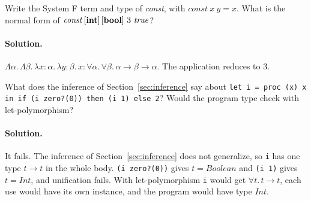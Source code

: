 \begin{exercise}
Write the System F term and type of \textit{const}, with
$\mathit{const}\ x\ y = x$. What is the normal form of
$\mathit{const}\,[\tyint]\,[\tybool]\ 3\ \mathit{true}$?
\end{exercise}

\paragraph{Solution.} $\Lambda \alpha.\, \Lambda \beta.\, \lambda x{:}\alpha.\, \lambda y{:}\beta.\, x : \forall \alpha.\, \forall \beta.\, \alpha \to \beta \to \alpha$.
The application reduces to $3$.

\begin{exercise}
What does the inference of Section~\ref{sec:inference} say about
\texttt{let i = proc (x) x in if (i zero?(0)) then (i 1) else 2}? Would the
program type check with let-polymorphism?
\end{exercise}

\paragraph{Solution.} It fails. The inference of Section~\ref{sec:inference} does
not generalize, so \texttt{i} has one type $t \to t$ in the whole body.
\texttt{(i zero?(0))} gives $t = \mathit{Boolean}$ and \texttt{(i 1)} gives
$t = \mathit{Int}$, and unification fails. With let-polymorphism \texttt{i} would get
$\forall t.\, t \to t$, each use would have its own instance, and the program
would have type $\mathit{Int}$.
